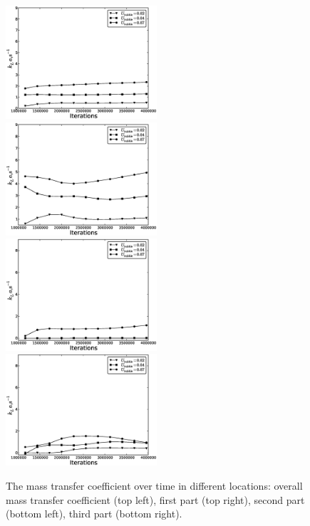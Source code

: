 \documentclass{article}
\begin{document}
\begin{figure}[htb!]
\includegraphics[width=0.5\textwidth]{Figures/steady_triple_overall.eps}
\includegraphics[width=0.5\textwidth]{Figures/steady_triple_first.eps}\\
\includegraphics[width=0.5\textwidth]{Figures/steady_triple_second.eps}
\includegraphics[width=0.5\textwidth]{Figures/steady_triple_third.eps}\\
\caption{The mass transfer coefficient over time in different locations: overall mass transfer
coefficient (top left), first part (top right), second part (bottom left), third part (bottom
right). \label{fig:results:triple}}
\end{figure}
\end{document}
